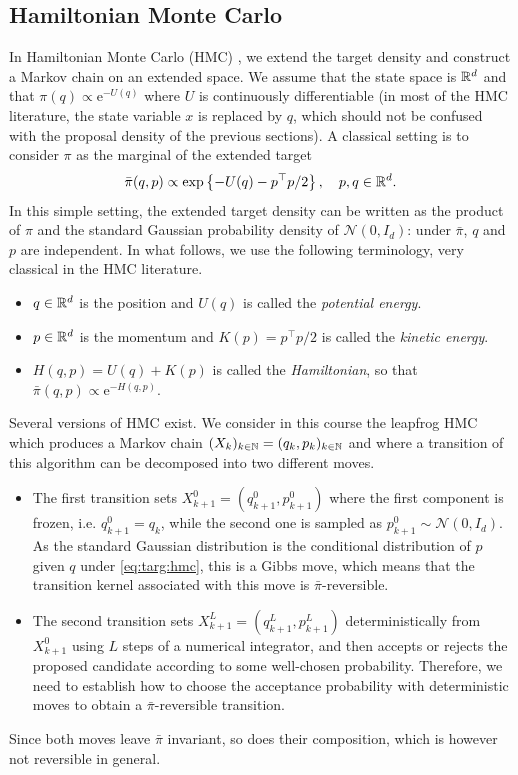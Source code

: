 \documentclass[english,graybox,envcountchap,envcountsame,sectrefs,shortlabels]{svmono}
\theoremstyle{style}
\newcommand{\rme}{\mathrm{e}}
\newcommand{\gauss}{\mathcal{N}}
\newcommand{\eqsp}{}
\begin{document}
\subsection{Hamiltonian Monte Carlo}
In Hamiltonian Monte Carlo (HMC) \cite{duane1987hybrid,neal2011mcmc}, we extend the target density and construct a Markov chain on an extended space. We assume that the state space is $\mathbb{R}^d$ and that  $\pi(q)\propto \rme^{-U(q)}$ where $U$ is continuously differentiable (in most of the HMC literature, the state variable $x$ is replaced by $q$, which should not be confused with the proposal density of the previous sections). A classical setting is to consider $\pi$ as the marginal of the extended target
\begin{equation}
\label{eq:targ:hmc}
\bar{\pi}(q,p) \propto \exp \lrcb{-U(q)-p^\top p/2}\eqsp, \quad p,q \in \rset^d\eqsp.
\end{equation}
In this simple setting, the extended target density can be written as the product of $\pi$ and the standard Gaussian probability density of  $\gauss(0,I_d)$: under $\bar\pi$, $q$ and $p$ are independent.
In what follows, we  use the following terminology, very classical in the HMC literature.
\begin{itemize}[-]
\item $q\in \mathbb{R}^d$ is the position and $U(q)$ is called the {\em potential energy}.
\item $p\in \mathbb{R}^d$ is the momentum and $K(p)=p^\top p/2$ is called the {\em kinetic energy}.
\item $H(q,p)=U(q)+K(p)$ is called the {\em Hamiltonian}, so that $\bar\pi(q,p)\propto\rme^{-H(q,p)}$.
\end{itemize}
  
Several versions of HMC exist. We consider in this course the leapfrog HMC which produces a Markov chain $(X_k)_{k\in\mathbb{N}}=(q_k,p_k)_{k\in\mathbb{N}}$ and where a transition of this algorithm can be decomposed into two different moves.
\begin{itemize}[-]
\item The first transition sets $X_{k+1}^0 = (q_{k+1}^0,p_{k+1}^0)$ where the first component is frozen, i.e. $q_{k+1}^0=q_{k}$, while the second one is sampled as  $p_{k+1}^0\sim \gauss(0,I_d)$. As the standard Gaussian distribution is  the conditional distribution of $p$ given $q$ under \eqref{eq:targ:hmc}, this is a Gibbs move, which means that the transition kernel associated with this move is $\bar{\pi}$-reversible.
\item The second transition sets  $X_{k+1}^L = (q_{k+1}^L,p_{k+1}^L)$ deterministically from  $X_{k+1}^0$ using $L$ steps of a numerical integrator, and then  accepts or rejects the proposed candidate according to some well-chosen probability. Therefore, we need to establish how to choose the acceptance probability with deterministic moves to obtain a $\bar{\pi}$-reversible transition.
\end{itemize}
Since both moves leave $\bar\pi$ invariant, so does their composition, which is however not reversible in general.
\end{document}
